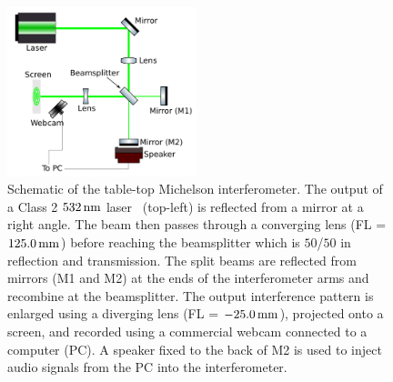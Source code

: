 \documentclass[paper-main.tex]{subfiles}
\begin{document}
\begin{figure}
	\includegraphics[width=0.49\textwidth]{figures/ifo_schematic_webcam_edit.pdf}
	\caption{\label{fig:ifo_schematic_webcam}
Schematic of the table-top Michelson interferometer. 
The output of a Class 2 $532\,{\rm nm}$ laser~\cite{ThorLabsIFO} (top-left) is reflected from a mirror at a right angle. The beam then passes through a converging lens (FL = $125.0\,{\rm mm}$) before reaching the beamsplitter which is $50$/$50$ in reflection and transmission. 
The split beams are reflected from mirrors (M1 and M2) at the ends of the interferometer arms and recombine at the beamsplitter. 
The output interference pattern is enlarged using a diverging lens (FL = $-25.0\,{\rm mm}$), projected onto a screen, and recorded using a commercial webcam connected to a computer (PC). 
A speaker fixed to the back of M2 is used to inject audio signals from the PC into the interferometer.
    }
\end{figure}
\end{document}
